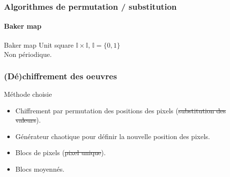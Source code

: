         \begin{frame}
            \frametitle{Algorithmes de permutation / substitution}
            \framesubtitle{Baker map}
            \begin{block}{Baker map}
                Unit square $\mathbb{I} \times \mathbb{I}$, $\mathbb{I} = \{0, 1\}$\\
                Non périodique.
            \end{block}
        \end{frame}

        \begin{frame}
            \frametitle{(Dé)chiffrement des oeuvres}
            \begin{block}{Méthode choisie}
                \begin{itemize}
                    \item Chiffrement par permutation des positions des pixels (\sout{substitution des valeurs}).
                    \item Générateur chaotique pour définir la nouvelle position des pixels.
                    \item Blocs de pixels (\sout{pixel unique}).
                    \item Blocs moyennés.
                \end{itemize}
            \end{block}
        \end{frame}
